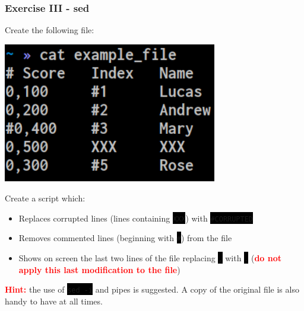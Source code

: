 \documentclass[unknownkeysallowed, 10pt, a4 paper, handout]{beamer}
\newcommand{\focus}[1]{\textbf{\textcolor{red}{#1}}}
\newcommand{\code}[1]{\colorbox{black}{\color{green}\texttt{#1}}}
\newcommand{\sidebyside}[5]{
  \begin{minipage}{#1\textwidth}
    #2
  \end{minipage} #3 \begin{minipage}{#4\textwidth}
    #5
  \end{minipage}
}
\begin{document}
\begin{frame}
  \begin{center}
    \frametitle{Exercise III - sed}

    \sidebyside{0.35}{
      Create the following file:
    }{\hfill}{0.60}{
      \begin{center}
        \includegraphics[width=0.70\textwidth]{pics/ex_3.png}
      \end{center}
    }

    \vspace{2mm}

    Create a script which:

    \begin{itemize}
      \item Replaces corrupted lines (lines containing \code{XXX}) with
        \code{\#CORRUPTED}
      \item Removes commented lines (beginning with \code{\#}) from the file
      \item Shows on screen the last two lines of the file replacing \code{,}
        with \code{.} (\focus{do not apply this last modification to the file})
    \end{itemize}

    \vspace{2mm}

    \focus{Hint:} the use of \code{sed -i} and pipes is suggested. A copy of
    the original file is also handy to have at all times.
  \end{center}
\end{frame}
\end{document}
